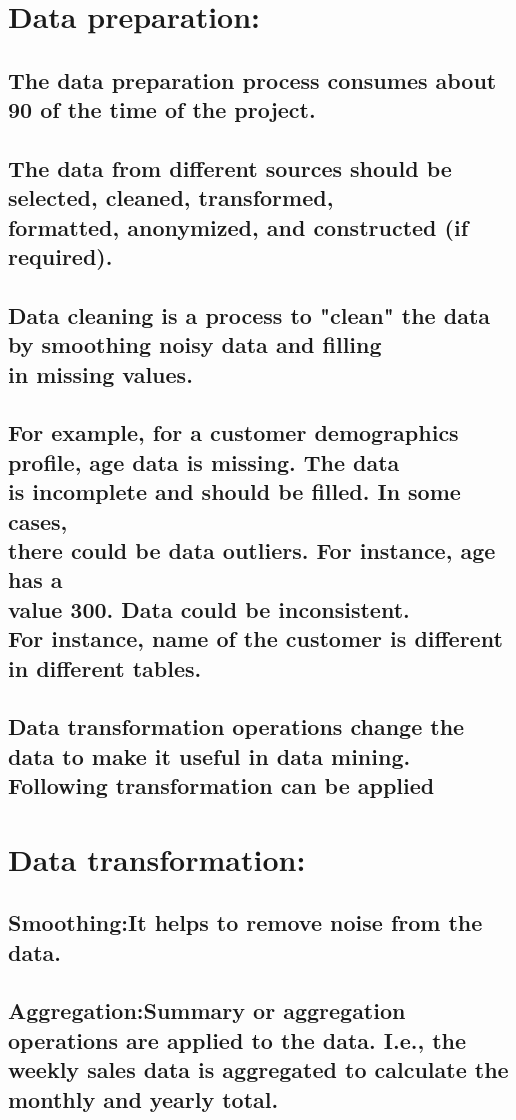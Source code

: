 \documentclass{article}
\begin{document}
\section{Data preparation:}
\subsection{The data preparation process consumes about 90 of the time of the project.}
\subsection{The data from different sources should be selected, cleaned, transformed, \\formatted, anonymized, and constructed (if required).}
\subsection{Data cleaning is a process to "clean" the data by smoothing noisy data and filling \\in missing values.}
\subsection{For example, for a customer demographics profile, age data is missing. The data\\ is incomplete and should be filled. In some cases,\\ there could be data outliers. For instance, age has a\\ value 300. Data could be inconsistent. \\For instance, name of the customer is different in different tables.}
\subsection{Data transformation operations change the data to make it useful in data mining.\\Following transformation can be applied}
\section{Data transformation:}
\subsection*{Smoothing:\small It helps to remove noise from the data. }
\subsection*{Aggregation:\small Summary or aggregation operations are applied to the data. I.e., the weekly sales data is aggregated to calculate the monthly and yearly total.}
\end{document}
